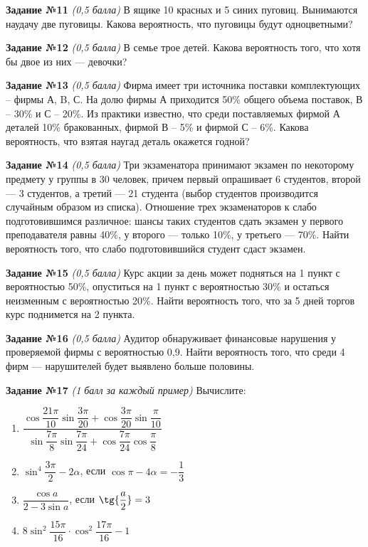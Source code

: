 \documentclass[12pt, a4paper]{article}
\begin{document}
\textbf{Задание №11} \textit{(0,5 балла)} В ящике 10 красных и 5 синих пуговиц. Вынимаются наудачу две пуговицы. Какова вероятность, что пуговицы будут одноцветными? 

\textbf{Задание №12} \textit{(0,5 балла)} В семье трое детей. Какова вероятность того, что хотя бы двое из них — девочки?

\textbf{Задание №13} \textit{(0,5 балла)} Фирма имеет три источника поставки комплектующих – фирмы А, B, С. На долю фирмы А приходится 50\% общего объема поставок, В – 30\% и С – 20\%. Из практики известно, что среди поставляемых фирмой А деталей 10\% бракованных, фирмой В – 5\% и фирмой С – 6\%. Какова вероятность, что взятая наугад деталь окажется годной?

\textbf{Задание №14} \textit{(0,5 балла)} Три экзаменатора принимают экзамен по некоторому предмету у группы в 30 человек, причем первый опрашивает 6 студентов, второй — 3 студентов, а третий — 21 студента (выбор студентов производится случайным образом из списка). Отношение трех экзаменаторов к слабо подготовившимся различное: шансы таких студентов сдать экзамен у первого преподавателя равны 40\%, у второго — только 10\%, у третьего — 70\%. Найти вероятность того, что слабо подготовившийся студент сдаст экзамен.

\textbf{Задание №15} \textit{(0,5 балла)} Курс акции за день может подняться на 1 пункт с вероятностью 50\%, опуститься на 1 пункт с вероятностью 30\% и остаться неизменным с вероятностью 20\%. Найти вероятность того, что за 5 дней торгов курс поднимется на 2 пункта.

\textbf{Задание №16} \textit{(0,5 балла)} Аудитор обнаруживает финансовые нарушения у проверяемой фирмы с вероятностью 0,9. Найти вероятность того, что среди 4 фирм — нарушителей будет выявлено больше половины.
\newpage

\textbf{Задание №17} \textit{(1 балл за каждый пример)} Вычислите:
\begin{enumerate}[label=\asbuk*)]
	\item $\dfrac{\cos{\dfrac{21\pi}{10}}\sin{\dfrac{3\pi}{20}}+\cos{\dfrac{3\pi}{20}}\sin{\dfrac{\pi}{10}}}{\sin{\dfrac{7\pi}{8}}\sin{\dfrac{7\pi}{24}}+\cos{\dfrac{7\pi}{24}}\cos{\dfrac{\pi}{8}}}$
	\item $\sin^4{\dfrac{3\pi}{2}-2\alpha}$, если $\cos{\pi-4\alpha}=-\dfrac{1}{3}$
	\item $\dfrac{\cos{a}}{2-3\sin{a}}$, если $\tg{\dfrac{a}{2}}=3$
	\item $8\sin^2{\dfrac{15\pi}{16}}\cdot\cos^2{\dfrac{17\pi}{16}}-1$
\end{enumerate}
\end{document}
